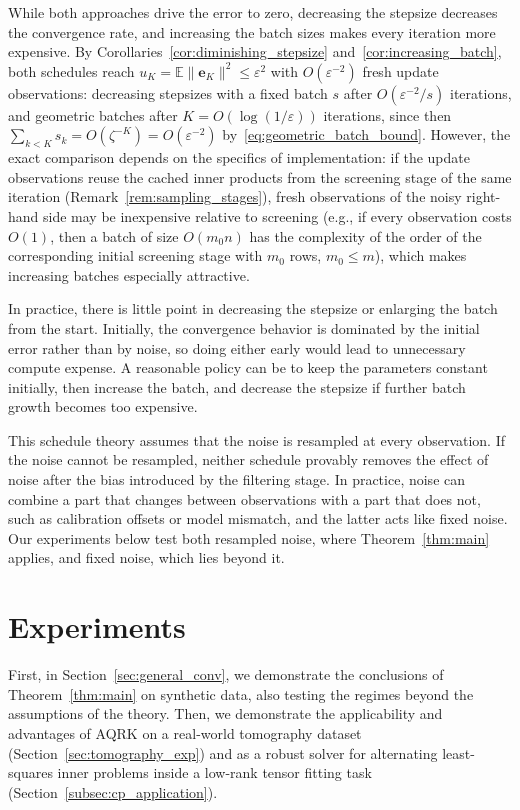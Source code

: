 \documentclass[pdflatex,sn-mathphys-num]{sn-jnl}
\theoremstyle{thmstyleone}
\theoremstyle{thmstylethree}
\newcommand{\ve}{\mathbf{e}}
\begin{document}
While both approaches drive the error to zero, decreasing the stepsize decreases the convergence rate, and increasing the batch sizes makes every iteration more expensive. By Corollaries~\ref{cor:diminishing_stepsize}
and~\ref{cor:increasing_batch}, both schedules reach $u_K =\mathbb E\|\ve_K\|^2\le\varepsilon^2$
with $O(\varepsilon^{-2})$ fresh update observations: decreasing stepsizes with
a fixed batch $s$ after $O(\varepsilon^{-2}/s)$ iterations, and geometric
batches after $K=O(\log(1/\varepsilon))$ iterations, since then
$\sum_{k<K}s_k=O(\zeta^{-K})=O(\varepsilon^{-2})$ by~\eqref{eq:geometric_batch_bound}. However, the exact comparison depends on the specifics of implementation: if the update observations reuse the cached inner
products from the screening stage of the same iteration (Remark~\ref{rem:sampling_stages}), fresh
observations of the noisy right-hand side may be inexpensive relative to screening (e.g., if every observation costs $O(1)$, then a batch of size $O(m_0n)$ has the complexity of the order of the corresponding initial screening stage with $m_0$ rows, $m_0 \le m$), which makes increasing batches especially attractive. 

In practice, there is little point in decreasing the stepsize or enlarging the batch from the start. Initially, the convergence behavior is dominated by the initial error rather than by noise, so doing either early would lead to unnecessary compute expense. A reasonable policy can be to keep the
parameters constant initially, then increase the batch, and decrease the stepsize if further batch growth becomes too expensive.

This schedule theory assumes that the noise is resampled at every observation. If the noise cannot be resampled, neither schedule provably removes the effect of noise after the bias introduced by the filtering stage. In
practice, noise can combine a part that changes between observations with
a part that does not, such as calibration offsets or model mismatch, and the
latter acts like fixed noise. Our experiments below test both resampled
noise, where Theorem~\ref{thm:main} applies, and fixed noise, which lies
beyond it.

\section{Experiments}
\label{sec:experiments}

First, in Section~\ref{sec:general_conv}, we demonstrate the conclusions of Theorem~\ref{thm:main} on synthetic data, also testing the regimes beyond the assumptions of the theory. Then, we demonstrate the applicability and advantages of AQRK on a real-world tomography dataset (Section~\ref{sec:tomography_exp}) and as a robust solver for alternating least-squares inner problems  inside a low-rank tensor fitting task (Section~\ref{subsec:cp_application}).
\end{document}
